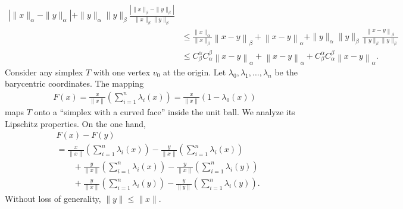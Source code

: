 \documentclass[10pt,a4paper]{article}
\begin{document}
\begin{align*}
        \left| \| x \|_{\alpha} - \| y \|_{\alpha} \right|
            + 
        \| y \|_{\alpha} \| y \|_{\beta} 
        \frac{ \left| \| x \|_{\beta} - \| y \|_{\beta} \right| }{ \| x \|_{\beta} \| y \|_{\beta} }
        \\&\leq 
        \frac{ \| x \|_{\alpha} }{ \| x \|_{\beta} } 
        \left\| x - y \right\|_{\beta}
            + 
        \left\| x - y \right\|_{\alpha}
            + 
        \| y \|_{\alpha} \| y \|_{\beta} 
        \frac{ \left\| x - y \right\|_{\beta} }{ \| y \|_{\beta} \| y \|_{\beta} }
        \\&\leq 
        C^{\alpha}_{\beta} 
        C^{\beta}_{\alpha}
        \left\| x - y \right\|_{\alpha}
            + 
        \left\| x - y \right\|_{\alpha}
            + 
        C^{\alpha}_{\beta} 
        C^{\beta}_{\alpha}
        \left\| x - y \right\|_{\alpha}
        .
    \end{align*}
    Consider any simplex $T$ with one vertex $v_0$ at the origin. 
    Let $\lambda_{0}, \lambda_{1}, \dots, \lambda_{n}$ be the barycentric coordinates. 
    The mapping 
    \begin{align}
        F(x) = \frac{x}{\|x\|} \left( \sum_{i=1}^{n} \lambda_{i}(x) \right) = \frac{x}{\|x\|} \left( 1 - \lambda_{0}(x) \right)
    \end{align}
    maps $T$ onto a ``simplex with a curved face'' inside the unit ball. We analyze its Lipschitz properties.
    On the one hand, 
    \begin{align}
        &
        F(x) - F(y)
        \\&
        =
        \frac{x}{\|x\|} \left( \sum_{i=1}^{n} \lambda_{i}(x) \right)
        -
        \frac{y}{\|x\|} \left( \sum_{i=1}^{n} \lambda_{i}(x) \right)
        \\&\qquad 
        +
        \frac{y}{\|x\|} \left( \sum_{i=1}^{n} \lambda_{i}(x) \right)
        -
        \frac{y}{\|x\|} \left( \sum_{i=1}^{n} \lambda_{i}(y) \right)
        \\&\qquad 
        +
        \frac{y}{\|x\|} \left( \sum_{i=1}^{n} \lambda_{i}(y) \right)
        -
        \frac{y}{\|y\|} \left( \sum_{i=1}^{n} \lambda_{i}(y) \right)
        .    
    \end{align}
    Without loss of generality, $\|y\| \leq \|x\|$. 
\end{document}
